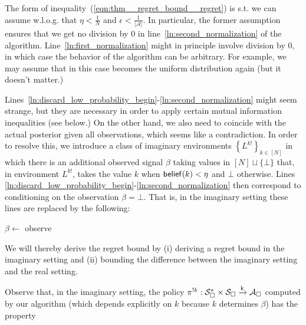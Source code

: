 \documentclass[anon,12pt]{colt2018} %
\newcommand{\AP}[1]{\left(#1\right)}
\newcommand{\AC}[1]{\left\{#1\right\}}
\newcommand{\Abs}[1]{\left\vert #1 \right\vert}
\newcommand{\K}{\xrightarrow{\textnormal{k}}}
\newcommand{\A}{\mathcal{A}}
\newcommand{\St}{\mathcal{S}}
\newcommand{\Rev}{\beta}
\newcommand{\IP}{\pi^{!k}}
\begin{document}
The form of inequality~(\ref{eqn:thm__regret_bound__regret}) is s.t. we can assume w.l.o.g. that $\eta < \frac{1}{N}$ and $\epsilon < \frac{1}{\Abs{\A}}$. In particular, the former assumption ensures that we get no division by 0 in line~\ref{ln:second_normalization} of the algorithm. Line~\ref{ln:first_normalization} might in principle involve division by 0, in which case the behavior of the algorithm can be arbitrary. For example, we may assume that in this case \Z becomes the uniform distribution again (but it doesn't matter.)

Lines~\ref{ln:discard_low_probability_begin}-\ref{ln:second_normalization} might seem strange, but they are necessary in order to apply certain mutual information inequalities (see below.) On the other hand, we also need \Z to coincide with the actual posterior given all observations, which seems like a contradiction. In order to resolve this, we introduce a class of imaginary environments $\AC{L^{k!}}_{k\in[N]}$ in which there is an additional observed signal $\Rev$ taking values in $[N]\sqcup\{\bot\}$ that, in environment $L^{k!}$, takes the value $k$ when $\DataSty{belief}(k) < \eta$ and $\bot$ otherwise. Lines \ref{ln:discard_low_probability_begin}-\ref{ln:second_normalization} then correspond to conditioning \Z on the observation $\beta=\bot$. That is, in the imaginary setting these lines are replaced by the following:

\begin{algorithm}[h]

\setcounter{AlgoLine}{22}

$\beta\leftarrow$ observe

\eIf{$\beta = \bot$}{
        \For{$k=0$ \KwTo $N-1$}{
                \If{$\Z(k) < \eta$}{
                        $\Z(k) \leftarrow 0$
                }
        }
        \Z$\leftarrow\AP{\sum_{k=0}^{N-1}\Z(k)}^{-1}\cdot\Z$\;
}{
        \Z$ \leftarrow \boldsymbol{0}$\;
        $\Z(\beta) \leftarrow 1$\;
}

\end{algorithm}

We will thereby derive the regret bound by (i) deriving a regret bound in the imaginary setting and (ii) bounding the difference between the imaginary setting and the real setting.

Observe that, in the imaginary setting, the policy $\IP: \St_\square^* \times \St_\square \K \A_\square$ computed by our algorithm (which depends explicitly on $k$ because $k$ determines $\beta$) has the property
\end{document}
